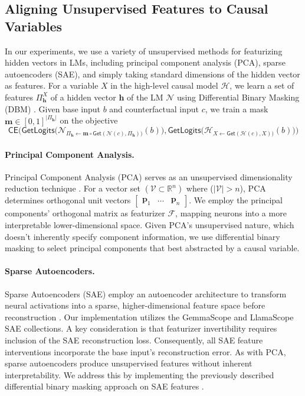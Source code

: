 \documentclass{article}
\theoremstyle{plain}
\theoremstyle{definition}
\theoremstyle{remark}
\begin{document}
\subsection{Aligning Unsupervised Features to Causal Variables}
\label{app:causal_variable_unsupervised_details}
In our experiments, we use a variety of unsupervised methods for featurizing hidden vectors in LMs, including principal component analysis (PCA), sparse autoencoders (SAE), and simply taking standard dimensions of the hidden vector as features. For a variable $X$ in the high-level causal model $\mathcal{H}$, we learn a set of features $\Pi^X_{\mathbf{h}}$ of a hidden vector $\mathbf{h}$ of the LM $\mathcal{N}$ using Differential Binary Masking (DBM) \citep{Cao2020,Cao2022, Csordas2021, Davies2023}. Given base input $b$ and counterfactual input $c$, we train a mask $\mathbf{m} \in [0,1]^{|\Pi_{\mathbf{h}}|}$ on the objective
\begin{equation}
\mathsf{CE}\Big(\mathsf{GetLogits}\big(\mathcal{N}_{\Pi_{\mathbf{h}} \leftarrow \mathbf{m} \circ \mathsf{Get}(\mathcal{N}(c), \Pi_\mathbf{h}))}(b)\big), \mathsf{GetLogits}\big(\mathcal{H}_{X \leftarrow \mathsf{Get}(\mathcal{H}(c), X))}(b)\big)\Big)
\end{equation}

\paragraph{Principal Component Analysis.} Principal Component Analysis (PCA) serves as an unsupervised dimensionality reduction technique \citep{tigges2023linearrepresentationssentimentlarge, marks2023geometry}. For a vector set $(\mathcal{V}\subset\mathbb{R}^{n})$ where ($|\mathcal{V}|>n$), PCA determines orthogonal unit vectors
$\begin{bmatrix}
\mathbf{p}_1 & \dots & \mathbf{p}_{n}
\end{bmatrix}$.
We employ the principal components' orthogonal matrix as featurizer $\mathcal{F}$, mapping neurons into a more interpretable lower-dimensional space.
Given PCA's unsupervised nature, which doesn't inherently specify component information, we use differential binary masking to select principal components that best abstracted by a causal variable.

\paragraph{Sparse Autoencoders.} Sparse Autoencoders (SAE) employ an autoencoder architecture to transform neural activations into a sparse, higher-dimensional feature space before reconstruction \citep{bricken2023monosemanticity, cunningham2023sparse}. Our implementation utilizes the GemmaScope \cite{Lieberum2024} and LlamaScope \cite{Llamascope} SAE collections.
A key consideration is that featurizer invertibility requires inclusion of the SAE reconstruction loss. Consequently, all SAE feature interventions incorporate the base input's reconstruction error.
As with PCA, sparse autoencoders produce unsupervised features without inherent interpretability. We address this by implementing the previously described differential binary masking approach on SAE features \cite{chaudhary2024evaluatingopensourcesparseautoencoders}.
\end{document}
